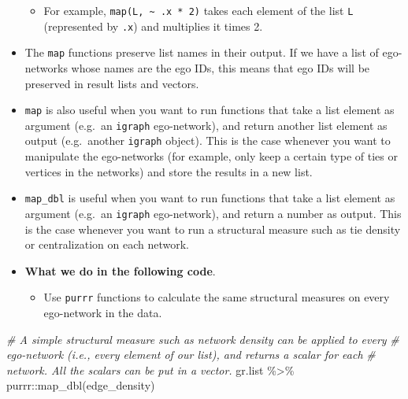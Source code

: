 \documentclass[
]{book}
\newenvironment{Shaded}{\begin{snugshade}}{\end{snugshade}}
\newcommand{\CommentTok}[1]{\textcolor[rgb]{0.56,0.35,0.01}{\textit{#1}}}
\newcommand{\FunctionTok}[1]{\textcolor[rgb]{0.00,0.00,0.00}{#1}}
\newcommand{\NormalTok}[1]{#1}
\newcommand{\SpecialCharTok}[1]{\textcolor[rgb]{0.00,0.00,0.00}{#1}}
\providecommand{\tightlist}{%
  \setlength{\itemsep}{0pt}\setlength{\parskip}{0pt}}
\begin{document}
\begin{itemize}
  \begin{itemize}
  \tightlist
  \item
    For example, \texttt{map(L,\ \textasciitilde{}\ .x\ *\ 2)} takes each element of the list \texttt{L} (represented by \texttt{.x}) and multiplies it times 2.
  \end{itemize}
\item
  The \texttt{map} functions preserve list names in their output. If we have a list of ego-networks whose names are the ego IDs, this means that ego IDs will be preserved in result lists and vectors.
\item
  \texttt{map} is also useful when you want to run functions that take a list element as argument (e.g.~an \texttt{igraph} ego-network), and return another list element as output (e.g.~another \texttt{igraph} object). This is the case whenever you want to manipulate the ego-networks (for example, only keep a certain type of ties or vertices in the networks) and store the results in a new list.
\item
  \texttt{map\_dbl} is useful when you want to run functions that take a list element as argument (e.g.~an \texttt{igraph} ego-network), and return a number as output. This is the case whenever you want to run a structural measure such as tie density or centralization on each network.
\item
  \textbf{What we do in the following code}.

  \begin{itemize}
  \tightlist
  \item
    Use \texttt{purrr} functions to calculate the same structural measures on every ego-network in the data.
  \end{itemize}
\end{itemize}

\begin{Shaded}
\begin{Highlighting}[]
\CommentTok{\# A simple structural measure such as network density can be applied to every}
\CommentTok{\# ego{-}network (i.e., every element of our list), and returns a scalar for each}
\CommentTok{\# network. All the scalars can be put in a vector.}
\NormalTok{gr.list }\SpecialCharTok{\%\textgreater{}\%}
\NormalTok{  purrr}\SpecialCharTok{::}\FunctionTok{map\_dbl}\NormalTok{(edge\_density) }
\end{Highlighting}
\end{Shaded}
\end{document}
